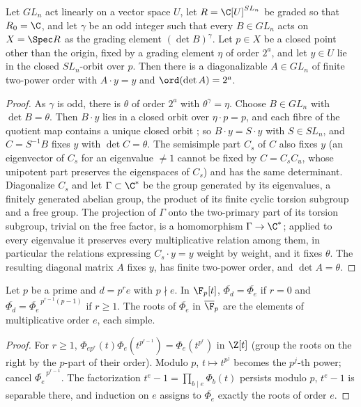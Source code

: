 \begin{lemma}\label{lem:lift}
Let $GL_n$ act linearly on a vector space $U$, let $R=\C[U]^{SL_n}$ be graded
so that $R_0=\C$, and let $\gamma$ be an odd integer such that every
$B\in GL_n$ acts on $X=\Spec R$ as the grading element $(\det B)^\gamma$. Let
$p\in X$ be a closed point other than the origin, fixed by a grading element
$\eta$ of order $2^a$, and let $y\in U$ lie in the closed $SL_n$-orbit over
$p$. Then there is a diagonalizable $A\in GL_n$ of finite two-power order with
$A\cdot y=y$ and $\ord(\det A)=2^a$.
\end{lemma}

\begin{proof}
As $\gamma$ is odd, there is $\theta$ of order $2^a$ with $\theta^\gamma=\eta$.
Choose $B\in GL_n$ with $\det B=\theta$. Then $B\cdot y$ lies in a closed orbit
over $\eta\cdot p=p$, and each fibre of the quotient map contains a unique
closed orbit \cite[Section I.1, p.~84]{Luna}; so $B\cdot y=S\cdot y$ with
$S\in SL_n$, and $C=S^{-1}B$ fixes $y$ with $\det C=\theta$. The semisimple
part $C_s$ of $C$ also fixes $y$ (an eigenvector of $C_s$ for an eigenvalue
$\ne1$ cannot be fixed by $C=C_sC_u$, whose unipotent part preserves the
eigenspaces of $C_s$) and has the same determinant. Diagonalize $C_s$ and let
$\Gamma\subset\C^*$ be the group generated by its eigenvalues, a finitely
generated abelian group, the product of its finite cyclic torsion subgroup and
a free group. The projection of $\Gamma$ onto the two-primary part of its
torsion subgroup, trivial on the free factor, is a homomorphism
$\Gamma\to\C^*$; applied to every eigenvalue it preserves every multiplicative
relation among them, in particular the relations expressing $C_s\cdot y=y$
weight by weight, and it fixes $\theta$. The resulting diagonal matrix $A$
fixes $y$, has finite two-power order, and $\det A=\theta$.
\end{proof}

\begin{lemma}\label{lem:cyclotomic}
Let $p$ be a prime and $d=p^re$ with $p\nmid e$. In $\F_p[t]$,
$\overline{\Phi_d}=\overline{\Phi_e}$ if $r=0$ and
$\overline{\Phi_d}=\overline{\Phi_e}^{\,p^{r-1}(p-1)}$ if $r\ge1$. The roots of
$\overline{\Phi_e}$ in $\overline\F_p$ are the elements of multiplicative order
$e$, each simple.
\end{lemma}

\begin{proof}
For $r\ge1$, $\Phi_{ep^r}(t)\Phi_e(t^{p^{r-1}})=\Phi_e(t^{p^r})$ in $\Z[t]$
(group the roots on the right by the $p$-part of their order). Modulo $p$,
$t\mapsto t^{p^j}$ becomes the $p^j$-th power; cancel
$\overline{\Phi_e}^{\,p^{r-1}}$. The factorization $t^e-1=\prod_{b\mid e}
\Phi_b(t)$ persists modulo $p$, $t^e-1$ is separable there, and induction on
$e$ assigns to $\overline{\Phi_e}$ exactly the roots of order $e$.
\end{proof}

